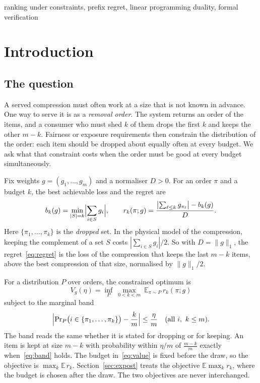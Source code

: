\begin{IEEEkeywords}
ranking under constraints, prefix regret, linear programming duality, formal verification
\end{IEEEkeywords}

\section{Introduction}
\label{sec:intro}

\subsection{The question}

A served compression must often work at a size that is not known in advance. One way to
serve it is as a \emph{removal order}. The system returns an order of the items, and a
consumer who must shed $k$ of them drops the first $k$ and keeps the other $m-k$. Fairness or
exposure requirements then constrain the distribution of the order: each item should be
dropped about equally often at every budget. We ask what that constraint costs when the order
must be good at every budget simultaneously.

Fix weights $g=(g_{1},\dots,g_{m})$ and a normaliser $D>0$. For an order $\pi$ and a budget
$k$, the best achievable loss and the regret are
\begin{equation}
b_{k}(g)=\min_{|S|=k}\Bigl|\sum_{i\in S}g_{i}\Bigr|,\qquad
r_{k}(\pi;g)=\frac{\bigl|\sum_{\ell\le k}g_{\pi_{\ell}}\bigr|-b_{k}(g)}{D}.
\label{eq:regret}
\end{equation}
Here $\{\pi_{1},\dots,\pi_{k}\}$ is the \emph{dropped} set. In the physical model of the
compression, keeping the complement of a set $S$ costs $|\sum_{i\in S}g_{i}|/2$. So with
$D=\|g\|_{1}$, the regret~\eqref{eq:regret} is the loss of the compression that keeps the
last $m-k$ items, above the best compression of that size, normalised by $\|g\|_{1}/2$.


For a distribution $P$ over orders, the constrained optimum is
\begin{equation}
V_{g}(\eta)=\inf_{P}\ \max_{0<k<m}\ \mathbb{E}_{\pi\sim P}\,r_{k}(\pi;g)
\label{eq:value}
\end{equation}
subject to the marginal band
\begin{equation}
\Bigl|\Pr\nolimits_{P}\bigl(i\in\{\pi_{1},\dots,\pi_{k}\}\bigr)-\frac{k}{m}\Bigr|\le\frac{\eta}{m}
\quad(\text{all }i,\ k\le m).
\label{eq:band}
\end{equation}
The band reads the same whether it is stated for dropping or for keeping. An item is kept at
size $m-k$ with probability within $\eta/m$ of $\frac{m-k}{m}$ exactly
when~\eqref{eq:band} holds. The budget in~\eqref{eq:value} is fixed before the draw, so the
objective is $\max_{k}\mathbb{E}\,r_{k}$. Section~\ref{sec:expost} treats the objective
$\mathbb{E}\max_{k}r_{k}$, where the budget is chosen after the draw. The two objectives are
never interchanged.

